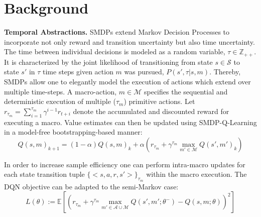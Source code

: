 \documentclass[10pt,letterpaper]{article}
\begin{document}
\section{Background}

\textbf{Temporal Abstractions.} 
SMDPs extend Markov Decision Processes to incorporate not only reward and transition uncertainty but also time uncertainty. The time between individual decisions is modeled as a random variable, $\tau \in \mathbb{Z}_{++}$. It is characterized by the joint likelihood of transitioning from state $s \in \mathcal{S}$ to state $s'$ in $\tau$ time steps given action $m$ was pursued, $P(s', \tau| s, m)$. Thereby, SMDPs allow one to elegantly model the execution of actions which extend over multiple time-steps. A macro-action, $m \in \mathcal{M}$ specifies the sequential and deterministic execution of multiple ($\tau_m$) primitive actions. Let $r_{\tau_m} = \sum_{i=1}^{\tau_m} \gamma^{i-1} r_{t+i}$ denote the accumulated and discounted reward for executing a macro. Value estimates can then be updated using SMDP-Q-Learning \cite{Parr_1998a} in a model-free bootstrapping-based manner:
$$Q(s, m)_{k+1} = (1-\alpha) Q(s, m)_k + \alpha \left( r_{\tau_m} + \gamma^{\tau_m} \max_{m' \in \mathcal{M}} Q(s', m')_k \right)$$  

In order to increase sample efficiency one can perform intra-macro updates for each state transition tuple $\{<s,a,r,s'>\}_{\tau_m}$ within the macro execution.
The DQN \cite{Mnih_2015} objective can be adapted to the semi-Markov case:
$$L(\theta) := \mathbb{E} [(r_{\tau_m} + \gamma^{\tau_m} \max_{m' \in \mathcal{A} \cup \mathcal{M}} Q(s',m';\theta^-) - Q(s,m; \theta))^2] $$

\end{document}
